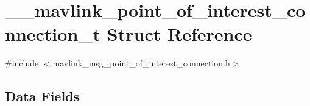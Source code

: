 \hypertarget{struct____mavlink__point__of__interest__connection__t}{\section{\+\_\+\+\_\+mavlink\+\_\+point\+\_\+of\+\_\+interest\+\_\+connection\+\_\+t Struct Reference}
\label{struct____mavlink__point__of__interest__connection__t}
}


{\ttfamily \#include $<$mavlink\+\_\+msg\+\_\+point\+\_\+of\+\_\+interest\+\_\+connection.\+h$>$}

\subsection*{Data Fields}

